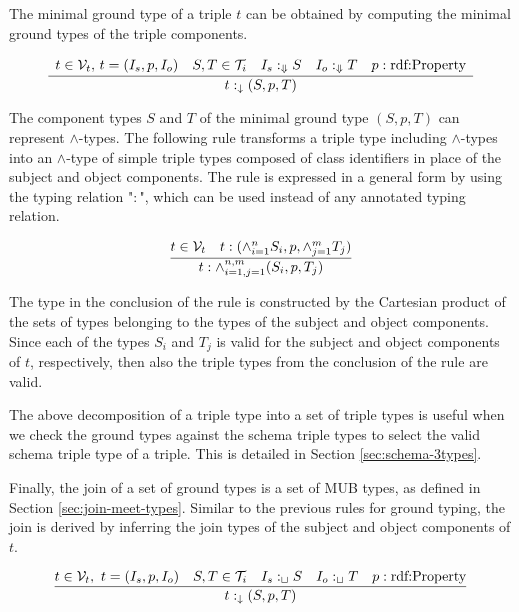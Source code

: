 \documentclass[runningheads]{llncs}
\newcommand{\darr}{\downarrow}
\newcommand{\Darr}{\Downarrow}
\newcommand{\V}{{\cal V}}
\newcommand{\TT}{{\cal T}}
\begin{document}
The minimal ground type of a triple $t$ can be obtained by computing
the minimal ground types of the triple components.

\begin{equation}
\label{rul:3-min-ground}
\dfrac{\begin{array}{c}
       t\in\V_t,\, t=(I_s,p,I_o)\quad
       S,T\in\TT_i\quad I_s:_\Darr\/S\quad I_o:_\Darr\/T\quad p:\text{rdf:Property}
       \end{array}}
      {t:_\darr\/(S,p,T)}
\end{equation}

The component types $S$ and $T$ of the minimal ground type $(S,p,T)$
can represent $\land$-types. The following rule transforms a triple
type including $\land$-types into an $\land$-type of simple triple
types composed of class identifiers in place of the subject and object
components. The rule is expressed in a general form by using the
typing relation "$:$", which can be used instead of any annotated typing
relation.

\begin{equation}
\label{rul:3-land-transform}
\dfrac{t\in\V_t\quad t:(\land_{i=1}^n\/S_i,p,\land_{j=1}^m\/T_j)}
      {t:\land_{i=1,j=1}^{n,m}(S_i,p,T_j)}
\end{equation}

The type in the conclusion of the rule is constructed by the Cartesian
product of the sets of types belonging to the types of the subject and
object components. Since each of the types $S_i$ and $T_j$ is valid
for the subject and object components of $t$, respectively, then also
the triple types from the conclusion of the rule are valid.

The above decomposition of a triple type into a set of triple types is
useful when we check the ground types against the schema triple types
to select the valid schema triple type of a triple. This is detailed in
Section \ref{sec:schema-3types}.

Finally, the join of a set of ground types is a set of MUB types, as
defined in Section \ref{sec:join-meet-types}. Similar to the
previous rules for ground typing, the join is derived by inferring the
join types of the subject and object components of $t$.

\begin{equation}
\label{rul:3-join}
\dfrac{t\in\V_t,\ t=(I_s,p,I_o)\quad 
       S,T\in\TT_i\quad I_s:_\sqcup\/S\quad I_o:_\sqcup\/T\quad p:\text{rdf:Property}}
      {t:_\darr\/(S,p,T)}
\end{equation}
\end{document}
